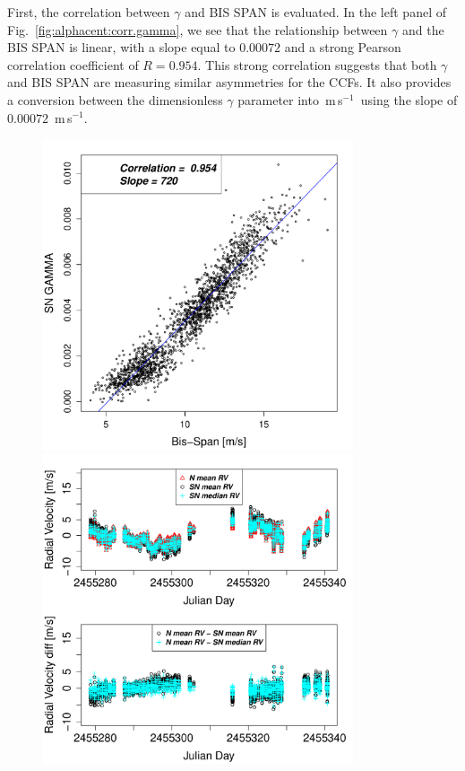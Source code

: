 \documentclass{aa}
\def\ms{\hbox{\,m\,s$^{-1}$}}         %
\newcommand{\xavier}[1]{{\color{blue}[[\textbf{Xavier: }#1]]}}
\begin{document}
First, the correlation between $\gamma$ and BIS SPAN is evaluated.
In the left panel of Fig.~\ref{fig:alphacent:corr.gamma}, we see that the relationship between $\gamma$ and the BIS SPAN is linear, with a slope equal to $0.00072$ and a strong Pearson correlation coefficient of $R=0.954$. This strong correlation suggests that both $\gamma$ and BIS SPAN are measuring similar asymmetries for the CCFs. 
It also provides a conversion between the dimensionless $\gamma$ parameter into \ms\, using the slope of $0.00072$ \ms.

%
\begin{figure}[htbp]
\begin{center}
\includegraphics[height = 3.6in]{HD12862_gamma_vs_bisspan.pdf} 
\includegraphics[height = 3.6in]{HD12862_[2]RadialVelocityDifferences.pdf} 

\end{center}
\end{figure}
\end{document}
